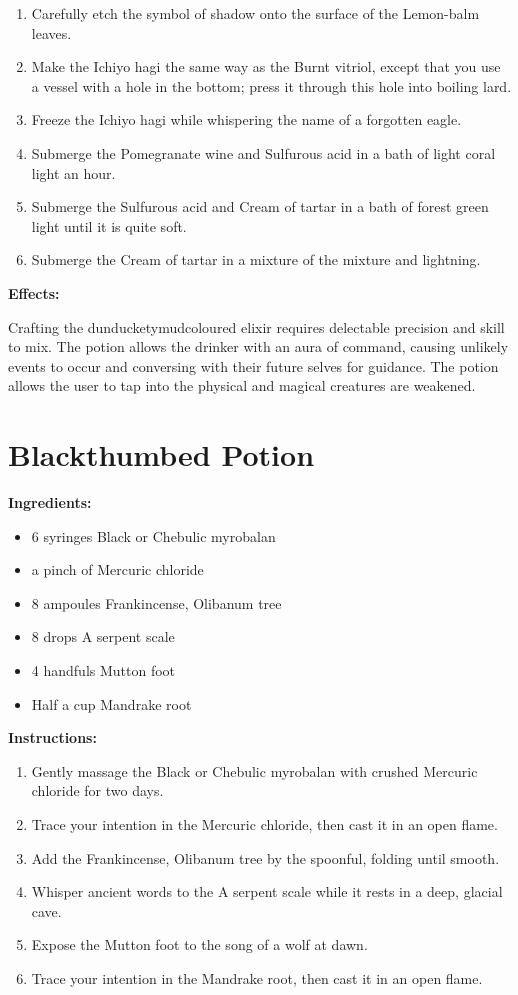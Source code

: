 \documentclass{article}
\begin{document}
\begin{enumerate}
  \item Carefully etch the symbol of shadow onto the surface of the Lemon-balm leaves.
  \item Make the Ichiyo hagi the same way as the Burnt vitriol, except that you use a vessel with a hole in the bottom; press it through this hole into boiling lard.
  \item Freeze the Ichiyo hagi while whispering the name of a forgotten eagle.
  \item Submerge the Pomegranate wine and Sulfurous acid in a bath of light coral light an hour.
  \item Submerge the Sulfurous acid and Cream of tartar in a bath of forest green light until it is quite soft.
  \item Submerge the Cream of tartar in a mixture of the mixture and lightning.
\end{enumerate}

\textbf{Effects:}

Crafting the dunducketymudcoloured elixir requires delectable precision and skill to mix. The potion allows the drinker with an aura of command, causing unlikely events to occur and conversing with their future selves for guidance. The potion allows the user to tap into the physical and magical creatures are weakened.

\newpage
\section*{Blackthumbed Potion}

\textbf{Ingredients:}

\begin{itemize}
  \item 6 syringes Black or Chebulic myrobalan
  \item a pinch of Mercuric chloride
  \item 8 ampoules Frankincense, Olibanum tree
  \item 8 drops A serpent scale
  \item 4 handfuls Mutton foot
  \item Half a cup Mandrake root
\end{itemize}

\textbf{Instructions:}

\begin{enumerate}
  \item Gently massage the Black or Chebulic myrobalan with crushed Mercuric chloride for two days.
  \item Trace your intention in the Mercuric chloride, then cast it in an open flame.
  \item Add the Frankincense, Olibanum tree by the spoonful, folding until smooth.
  \item Whisper ancient words to the A serpent scale while it rests in a deep, glacial cave.
  \item Expose the Mutton foot to the song of a wolf at dawn.
  \item Trace your intention in the Mandrake root, then cast it in an open flame.
\end{enumerate}
\end{document}
